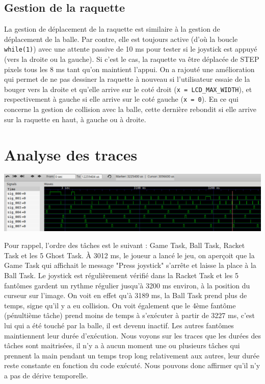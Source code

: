 \documentclass[a4paper]{article}
\begin{document}
\subsection{Gestion de la raquette}
La gestion de déplacement de la raquette est similaire à la gestion de déplacement de la balle. Par contre,
elle est toujours active (d'où la boucle \texttt{while(1)}) avec une attente passive de 10 ms pour tester
si le joystick est appuyé (vers la droite ou la gauche). Si c'est le cas, la raquette va être déplacée de STEP
pixels tous les 8 ms tant qu'on maintient l'appui. On a rajouté une amélioration qui permet de ne pas dessiner
la raquette à nouveau si l'utilisateur essaie de la bouger vers la droite et qu'elle arrive sur le coté droit
(\texttt{x = LCD_MAX_WIDTH}), et respectivement à gauche si elle arrive sur le coté gauche (\texttt{x = 0}).
\newline
En ce qui concerne la gestion de collision avec la balle, cette dernière rebondit si elle arrive sur la raquette
en haut, à gauche ou à droite.

\section{Analyse des traces}
\begin{center}
\includegraphics[scale=0.455]{../traces/traces1.png}
\end{center}
Pour rappel, l'ordre des tâches est le suivant : Game Task, Ball Task, Racket Task et les 5 Ghost Task.
À 3012 ms, le joueur a lancé le jeu, on aperçoit que la Game Task qui affichait le message "Press joystick"
s'arrête et laisse la place à la Ball Task. Le joystick est régulièrement vérifié dans la Racket Task et les
5 fantômes gardent un rythme régulier jusqu'à 3200 ms environ, à la position du curseur sur l'image. On voit
en effet qu'à 3189 ms, la Ball Task prend plus de temps, signe qu'il y a eu collision. On voit également que
le 4ème fantôme (pénultième tâche) prend moins de temps à s'exécuter à partir de 3227 ms, c'est lui qui a été
touché par la balle, il est devenu inactif. Les autres fantômes maintiennent leur durée d'exécution.
\newline
Nous voyons sur les traces que les durées des tâches sont maitrisées, il n'y a à aucun moment une ou plusieurs
tâches qui prennent la main pendant un temps trop long relativement aux autres, leur durée reste constante en
fonction du code exécuté. Nous pouvons donc affirmer qu’il n’y a pas de dérive temporelle.
\end{document}
